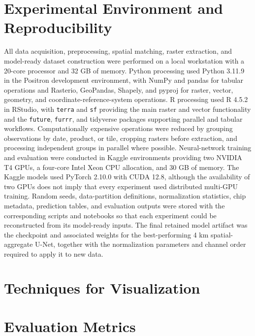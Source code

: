 \section{Experimental Environment and Reproducibility}

All data acquisition, preprocessing, spatial matching, raster extraction, and model-ready dataset construction were performed on a local workstation with a 20-core processor and 32 GB of memory. Python processing used Python 3.11.9 in the Positron development environment, with NumPy and pandas for tabular operations and Rasterio, GeoPandas, Shapely, and pyproj for raster, vector, geometry, and coordinate-reference-system operations. R processing used R 4.5.2 in RStudio, with \texttt{terra} and \texttt{sf} providing the main raster and vector functionality and the \texttt{future}, \texttt{furrr}, and tidyverse packages supporting parallel and tabular workflows. Computationally expensive operations were reduced by grouping observations by date, product, or tile, cropping rasters before extraction, and processing independent groups in parallel where possible. Neural-network training and evaluation were conducted in Kaggle environments providing two NVIDIA T4 GPUs, a four-core Intel Xeon CPU allocation, and 30 GB of memory. The Kaggle models used PyTorch 2.10.0 with CUDA 12.8, although the availability of two GPUs does not imply that every experiment used distributed multi-GPU training. Random seeds, data-partition definitions, normalization statistics, chip metadata, prediction tables, and evaluation outputs were stored with the corresponding scripts and notebooks so that each experiment could be reconstructed from its model-ready inputs. The final retained model artifact was the checkpoint and associated weights for the best-performing 4 km spatial-aggregate U-Net, together with the normalization parameters and channel order required to apply it to new data.

\section{Techniques for Visualization}

\section{Evaluation Metrics}

